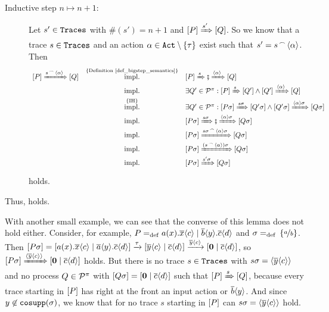 \begin{prf}
\begin{description}
\item[Inductive step $n\mapsto n+1$:] Let $s'\in\mathtt{Traces}$ with $\#(s')=n+1$ and $\left[P\right]\xRightarrow{s'}\left[Q\right]$. So we know that a trace $s\in\mathtt{Traces}$ and an action $\alpha\in\actions\setminus\set{\tau}$ exist such that $s'={s}^{\,\frown{}\,}{\langle\alpha\rangle}$. Then
\begin{align*}
	\begin{array}{lcl}
		\ec{P}\bigstep{\seqconc{s}{\seq{\alpha}}}\ec{Q} & \stackrel{\{\text{\refDef{def_bigstep_semantics}\}}}{\text{impl.}} & \ec{P}\bigstep{s}\fatsemi\bigstep{\seq{\alpha}}\ec{Q} \\
			& \text{impl.} & \exists{}Q'\in\procs:\ec{P}\bigstep{s}\ec{Q'}\wedge\ec{Q'}\bigstep{\seq{\alpha}}\ec{Q}\\
			& \stackrel{\{\text{IH\}}}{\text{impl.}} & \exists{}Q'\in\procs:\ec{P\sigma}\bigstep{s\sigma}\ec{Q'\sigma}\wedge\ec{Q'\sigma}\bigstep{\seq{\alpha}\sigma}\ec{Q\sigma}\\
			& \text{impl.} & \ec{P\sigma}\bigstep{s\sigma}\fatsemi\bigstep{\seq{\alpha}\sigma}\ec{Q\sigma}\\
			& \text{impl.} & \ec{P\sigma}\bigstep{\seqconc{s\sigma}{\seq{\alpha}\sigma}}\ec{Q\sigma}\\
			& \text{impl.} & \ec{P\sigma}\bigstep{\left(\seqconc{s}{\seq{\alpha}}\right)\sigma}\ec{Q\sigma}\\
			& \text{impl.} & \ec{P\sigma}\bigstep{s'\sigma}\ec{Q\sigma}
	\end{array}
\end{align*}
holds.
\end{description}
Thus,  holds.
\end{prf}

With another small example, we can see that the converse of this lemma does not hold either. Consider, for example, $P=_{\mathrm{def}}{}a(x).\overline{x}\langle c\rangle \mid \overline{b}\langle y\rangle.\overline{c}\langle d\rangle$ and $\sigma=_{\mathrm{def}}{}\left\{\nicefrac{a}{b}\right\}$. Then $\left[P\sigma\right]=\left[a(x).\overline{x}\langle c\rangle \mid \overline{a}\langle y\rangle.\overline{c}\langle d\rangle\right]\xrightarrow{\tau}\left[\overline{y}\langle c\rangle \mid \overline{c}\langle d\rangle\right]\xrightarrow{\overline{y}\langle c\rangle}\left[\mathbf{0} \mid \overline{c}\langle d\rangle\right]$, so $\left[P\sigma\right]\xRightarrow{\langle\overline{y}\langle c\rangle\rangle}\left[\mathbf{0} \mid \overline{c}\langle d\rangle\right]$ holds. But there is no trace $s\in\mathtt{Traces}$ with $s\sigma=\langle\overline{y}\langle c\rangle\rangle$ and no process $Q\in\mathcal P^{\pi}$ with $\left[Q\sigma\right]=\left[\mathbf{0} \mid \overline{c}\langle d\rangle\right]$ such that $\left[P\right]\xRightarrow{s}\left[Q\right]$, because every trace starting in $\left[P\right]$ has right at the front an input action or $\overline{b}\langle y\rangle$. And since $y\not\in\mathtt{cosupp}(\sigma)$, we know that for no trace $s$ starting in $\left[P\right]$ can $s\sigma=\langle\overline{y}\langle c\rangle\rangle$ hold.

